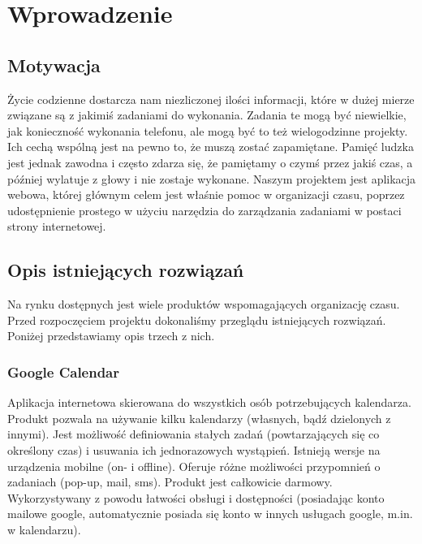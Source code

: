 \documentclass[pdflatex,11pt]{aghdpl}
\author{Marta~Drabarczyk, Krzysztof~Kutt, Michał~Nowak}
\date{2012}
\begin{document}
\titlepages

\tableofcontents
\clearpage

\chapter{Wprowadzenie}

\section{Motywacja}

Życie codzienne dostarcza nam niezliczonej ilości informacji, które w dużej mierze związane są z jakimiś zadaniami do wykonania. Zadania te mogą być niewielkie, jak konieczność wykonania telefonu, ale mogą być to też wielogodzinne projekty. Ich cechą wspólną jest na pewno to, że muszą zostać zapamiętane. Pamięć ludzka jest jednak zawodna i często zdarza się, że pamiętamy o czymś przez jakiś czas, a później wylatuje z głowy i nie zostaje wykonane. Naszym projektem jest aplikacja webowa, której głównym celem jest właśnie pomoc w organizacji czasu, poprzez udostępnienie prostego w użyciu narzędzia do zarządzania zadaniami w postaci strony internetowej.

\section{Opis istniejących rozwiązań}

Na rynku dostępnych jest wiele produktów wspomagających organizację czasu. Przed rozpoczęciem projektu dokonaliśmy przeglądu istniejących rozwiązań. Poniżej przedstawiamy opis trzech z nich.

\subsection{Google Calendar}

Aplikacja internetowa skierowana do wszystkich osób potrzebujących kalendarza. Produkt pozwala na używanie kilku kalendarzy (własnych, bądź dzielonych z innymi). Jest możliwość definiowania stałych zadań (powtarzających się co określony czas) i usuwania ich jednorazowych wystąpień. Istnieją wersje na urządzenia mobilne (on- i offline). Oferuje różne możliwości przypomnień o zadaniach (pop-up, mail, sms). Produkt jest całkowicie darmowy. Wykorzystywany z powodu łatwości obsługi i dostępności (posiadając konto mailowe google, automatycznie posiada się konto w innych usługach google, m.in. w kalendarzu).
\end{document}
